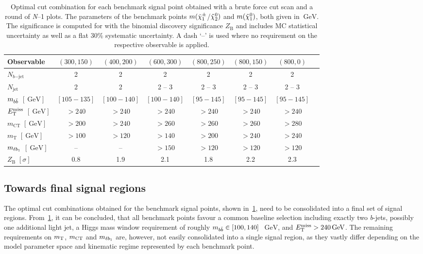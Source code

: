 \begin{table}
	\begin{center}
	\small
			\begin{tabular} {l c c c c c c c}
				\toprule
				Observable &  $(300,150)$ & $(400,200)$ & $(600,300)$  & $(800,250)$ & $(800,150)$ & $(800,0)$ \\
				\midrule
				$N_{b\mathrm{-jet}}$ &  2 & 2 & 2 & 2 & 2 & 2 \\
				$N_\mathrm{jet}$ & 2 & 2 & 2 -- 3 & 2 -- 3  & 2 -- 3 & 2 -- 3\\
				$m_{b\bar{b}}$  $[\SI{}{\GeV}]$& $[105-135]$ & $[100-140]$ & $[100-140]$ & $[95-145]$ & $[95-145]$ & $[95-145]$ \\
				$E_{\textrm{T}}^{\textrm{miss}}$ $[\SI{}{\GeV}]$ & $>240$ & $>240$ & $>240$ & $>240$ & $>240$  & $>240$\\
				$m_\mathrm{CT}$ $[\SI{}{\GeV}]$ &  $>200$ & $>240$ & $>260$ & $>260$ & $>260$   & $>280$ \\
				$m_\mathrm{T}$ $[\SI{}{\GeV}]$ &  $>100$ & $>120$ & $>140$ & $>200$ & $>240$ & $>240$ \\
				$m_{\ell b_{1}}$ $[\SI{}{\GeV}]$ &  -- & -- & $>150$ & $>120$ & $>120$ & $>120$ \\
				\midrule
				$Z_\mathrm{B}$ $[\sigma]$ & \multicolumn{1}{c}{0.8} & \multicolumn{1}{c}{1.9} & \multicolumn{1}{c}{2.1} & \multicolumn{1}{c}{1.8} & \multicolumn{1}{c}{2.2} & \multicolumn{1}{c}{2.3} \\
				\bottomrule
			\end{tabular}
		\caption{Optimal cut combination for each benchmark signal point obtained with a brute force cut scan and a round of \textit{N}--1 plots. The parameters of the benchmark points $m(\tilde{\chi}_1^\pm$/$\tilde{\chi}_2^0)$ and $m(\tilde{\chi}_1^0)$, both given in $\SI{}{\GeV}$. The significance is computed for \onethirtynineifb with the binomial discovery significance $Z_\mathrm{B}$ and includes MC statistical uncertainty as well as a flat 30\% systematic uncertainty. A dash `--' is used where no requirement on the respective observable is applied.}
		\label{tab:cut_scan_results}
	\end{center}
\end{table}




\subsection{Towards final signal regions}\label{sec:towards_signal_regions}

The optimal cut combinations obtained for the benchmark signal points, shown in~\cref{tab:cut_scan_results}, need to be consolidated into a final set of signal regions.
From~\cref{tab:cut_scan_results}, it can be concluded, that all benchmark points favour a common baseline selection including exactly two \textit{b}-jets, possibly one additional light jet, a Higgs mass window requirement of roughly $m_{b\bar{b}}\in [100,140]$~$\SI{}{\GeV}$, and $\etmiss > \SI{240}{\GeV}$.
The remaining requirements on $m_{\textrm{T}}$, $m_{\textrm{CT}}$ and $m_{\ell b_{1}}$ are, however, not easily consolidated into a single signal region, as they vastly differ depending on the model parameter space and kinematic regime represented by each benchmark point.

